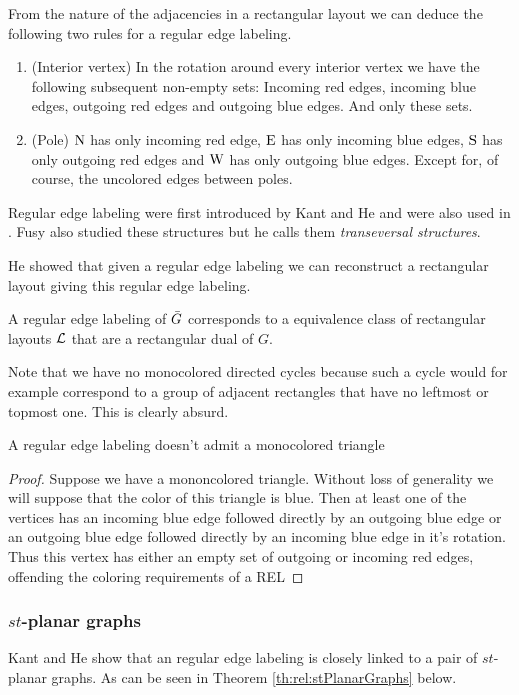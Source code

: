   From the nature of the adjacencies in a rectangular layout we can deduce the following two rules for a regular edge labeling.
  \begin{enumerate}
    \item (Interior vertex) In the rotation around every interior vertex we have the following subsequent non-empty sets: Incoming red edges, incoming blue edges, outgoing red edges and outgoing blue edges. And only these sets.
    \item (Pole) $\mathrm{N}$ has only incoming red edge, $\mathrm{E}$ has only incoming blue edges, $\mathrm{S}$ has only outgoing red edges and $\mathrm{W}$ has only outgoing blue edges. Except for, of course, the uncolored edges between poles.
  \end{enumerate}

  Regular edge labeling were first introduced by Kant and He \cite{Kant1997} and were also used in \cite{Eppstein2012}. Fusy also studied these structures \cite{Fusy2006,Fusy2009} but he calls them \emph{transeversal structures}.

  He showed \cite{He1993} that given a regular edge labeling we can reconstruct a rectangular layout giving this regular edge labeling.

  A regular edge labeling  of $\bar{G}$ corresponds to a equivalence class of rectangular layouts $\mathcal{L}$ that are a rectangular dual of $G$.

  Note that we have no monocolored directed cycles because such a cycle would for example correspond to a  group of adjacent rectangles that have  no leftmost or topmost one. This is clearly absurd.

  \begin{lemma}
    \label{lm:rel:noMonoColoredTriangles}
    A regular edge labeling doesn't admit a monocolored triangle
  \end{lemma}

  \begin{proof}
    Suppose we have a mononcolored triangle. Without loss of generality we will suppose that the color of this triangle is blue. Then at least one of the vertices has an incoming blue edge followed directly by an outgoing blue edge or an outgoing blue edge followed directly by an incoming blue edge in it's rotation. Thus this vertex has either an empty set of outgoing or incoming red edges, offending the coloring requirements of a REL
  \end{proof}

  \subsubsection{$st$-planar graphs}
    Kant and He \cite[pp.179]{Kant1997} show that an regular edge labeling is closely linked to a pair of $st$-planar graphs. As can be seen in Theorem \ref{th:rel:stPlanarGraphs} below.

